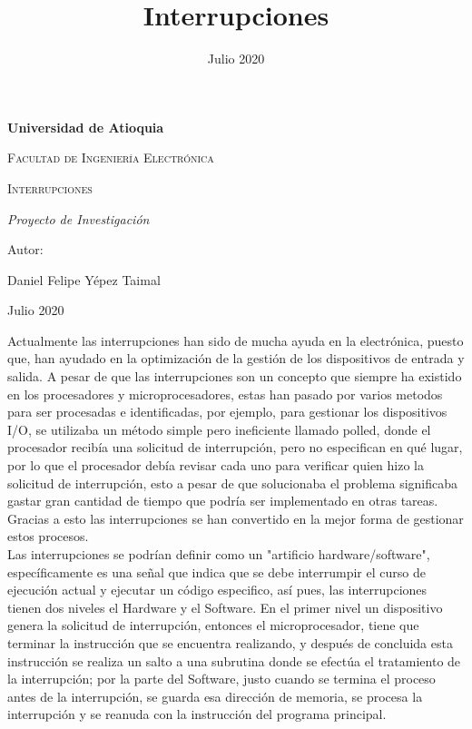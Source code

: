 \documentclass{article}
\title{Interrupciones}
\date{Julio 2020}
\begin{document}
\begin{titlepage}
\centering
{\bfseries\LARGE Universidad de Atioquia\par}
\vspace{1cm}
{\scshape\Large Facultad de Ingenier\'ia Electr\'onica \par}
\vspace{3cm}
{\scshape\Huge Interrupciones \par}
\vspace{3cm}
{\itshape\Large Proyecto de Investigaci\'on \par}
\vfill
{\Large Autor: \par}
{\Large Daniel Felipe Y\'epez Taimal \par}
\vfill
{\Large Julio 2020 \par}
\end{titlepage}

\maketitle

Actualmente las interrupciones han sido de mucha ayuda en la electrónica, puesto que, han ayudado en la optimización de la gestión de los dispositivos de entrada y salida. A pesar de que las interrupciones son un concepto que siempre ha existido en los procesadores y microprocesadores, estas han pasado por varios metodos para ser procesadas e identificadas, por ejemplo, para gestionar los dispositivos I/O, se utilizaba un método simple pero ineficiente llamado polled,\cite{Mar} donde el procesador recibía una solicitud de interrupción, pero no especifican en qué lugar, por lo que el procesador debía revisar cada uno para verificar quien hizo la solicitud de interrupción, esto a pesar de que solucionaba el problema significaba gastar gran cantidad de tiempo que podría ser implementado en otras tareas. Gracias a esto las interrupciones se han convertido en la mejor forma de gestionar estos procesos.\\

Las interrupciones se podrían definir como un \cite{Dar} "artificio hardware/software", específicamente es una señal que indica que se debe interrumpir el curso de ejecución actual y ejecutar un código especifico, así pues, las interrupciones tienen dos niveles el Hardware y el Software. \cite{Jho1} En el primer nivel un dispositivo genera la solicitud de interrupción, entonces el microprocesador, tiene que terminar la instrucción que se encuentra realizando, y después de concluida esta instrucción se realiza un salto a una subrutina donde se efectúa el tratamiento de la interrupción; por la parte del Software, justo cuando se termina el proceso antes de la interrupción, se guarda esa dirección de memoria, se procesa la interrupción y se reanuda con la instrucción del programa principal.\\
\end{document}
